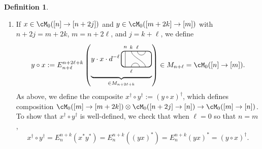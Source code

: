 \documentclass[11pt]{article}
\theoremstyle{plain}
\theoremstyle{definition}
\newtheorem{defn}[thm]{Definition}
\begin{document}
\begin{defn}
\begin{itemize}
\begin{enumerate}[label={\rm(C\arabic*)}]
\item
\label{compose:updown}
If $x\in \cM_0([n] \to [n+2j])$ and $y \in \cM_0([m+2k] \to [m])$
with $n+2j = m+2k$, $m= n + 2\ell$, and $j = k+\ell$,
we define
$$
y\circ x
:=
E^{n+2\ell + k}_{n+\ell}
\left(
\raisebox{.3cm}{$
\underbrace{
y\cdot x\cdot
d^{-\ell}\,
\begin{tikzpicture}[baseline = .3cm]
	\draw[thick, rounded corners = 5pt] (0,0) rectangle (1.5,.8);
	\draw (.2,0) -- (.2,.8);
	\draw (.8,.8) arc (-180:0:.2cm);
	\draw (1.2,0) .. controls ++(90:.3cm) and ++(270:.3cm) .. (.5,.8);
	\draw (.5,0) arc (180:0:.2cm);
	\node at (.2,1) {\scriptsize{$n$}};
	\node at (.5,1) {\scriptsize{$k$}};
	\node at (.8,1) {\scriptsize{$\ell$}};
	\node at (.5,-.2) {\scriptsize{$\ell$}};
\end{tikzpicture}
}_{\in M_{n+2\ell +k}}
$}
\right)
\in
M_{n+\ell}
=
\cM_0([n] \to [m]).
$$
As above, we define the composite $x^\dag \circ y^\dag := (y\circ x)^\dag$, which defines composition
$\cM_0([m] \to [m+2k]) \otimes \cM_0([n+2j] \to [n]) \to \cM_0([m] \to [n])$.
To show that $x^\dag \circ y^\dag$ is well-defined, we check that when $\ell=0$ so that $n=m$, 
\begin{equation}
\label{eq:n to n+2k to n}
x^\dag \circ y^\dag 
=
E^{n+k}_{n}(x^* y^*)
=
E^{n+k}_{n}((yx)^*) 
=
E^{n+k}_{n}(y x)^*
=
(y\circ x)^\dag.
\end{equation}


\end{enumerate}
\end{itemize}
\end{defn}
\end{document}
